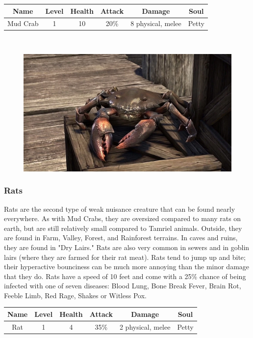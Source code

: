 \documentclass[12pt]{book}
\begin{document}
\begin{tabular}{|c|c|c|c|c|c|}
\hline
Name & Level & Health & Attack & Damage & Soul\\ \hline
Mud Crab & 1 & 10 & 20\% & 8 physical, melee & Petty\\ \hline
\end{tabular}\\

\begin{figure}[h]
	\centering
	\includegraphics[scale=0.75]{mudcrab.png}
\end{figure}

\subsubsection{Rats}
Rats are the second type of weak nuisance creature that can be found nearly everywhere. As with Mud Crabs, they are oversized compared to many rats on earth, but are still relatively small compared to Tamriel animals. Outside, they are found in Farm, Valley, Forest, and Rainforest terrains. In caves and ruins, they are found in "Dry Lairs." Rats are also very common in sewers and in goblin lairs (where they are farmed for their rat meat). Rats tend to jump up and bite; their hyperactive bounciness can be much more annoying than the minor damage that they do. Rats have a speed of 10 feet and come with a 25\% chance of being infected with one of seven diseases: Blood Lung, Bone Break Fever, Brain Rot, Feeble Limb, Red Rage, Shakes or Witless Pox.\\

\begin{tabular}{|c|c|c|c|c|c|}
\hline
Name & Level & Health & Attack & Damage & Soul\\ \hline
Rat & 1 & 4 & 35\% & 2 physical, melee & Petty\\ \hline
\end{tabular}\\
\end{document}
